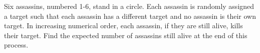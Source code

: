 Six assassins, numbered 1-6, stand in a circle. Each assassin is randomly assigned a target such that each assassin has a different target and no assassin is their own target. In increasing numerical order, each assassin, if they are still alive, kills their target. Find the expected number of assassins still alive at the end of this process.